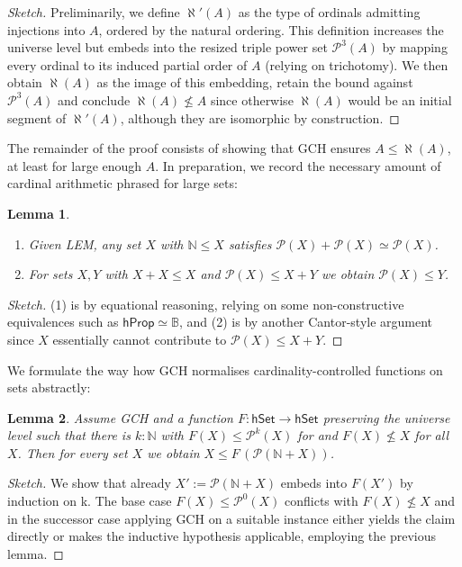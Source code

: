 \documentclass{easychair}
\newcommand{\nat}{\mathbb{N}}
\newcommand{\bool}{\mathbb{B}}
\newcommand{\pow}{\mathcal{P}}
\newcommand{\hprop}{\mathsf{hProp}}
\newcommand{\hset}{\mathsf{hSet}}
\newtheorem{lemma}{Lemma}
\begin{document}
\begin{proof}[Sketch]
	Preliminarily, we define $\aleph'(A)$ as the type of ordinals admitting injections into $A$, ordered by the natural ordering.
	This definition increases the universe level but embeds into the resized triple power set $\pow^3(A)$ by mapping every ordinal to its induced partial order of $A$ (relying on trichotomy).
	We then obtain $\aleph(A)$ as the image of this embedding, retain the bound against $\pow^3(A)$ and conclude $\aleph(A)\not\le A$ since otherwise $\aleph(A)$ would be an initial segment of $\aleph'(A)$, although they are isomorphic by construction.
\end{proof}

The remainder of the proof consists of showing that GCH ensures $A\le\aleph(A)$, at least for large enough $A$.
In preparation, we record the necessary amount of cardinal arithmetic phrased for large sets:

\begin{lemma}
	\label{cardinals}
	\begin{enumerate}[noitemsep]
		\item
		Given LEM, any set $X$ with $\nat\le X$ satisfies $\pow(X)+\pow(X)\simeq \pow(X)$.
		\item
		For sets $X,Y$ with $X+X\le X$ and $\pow (X)\le X+Y$ we obtain $\pow (X)\le Y$.
	\end{enumerate}
\end{lemma}
\begin{proof}[Sketch]
	(1) is by equational reasoning, relying on some non-constructive equivalences such as $\hprop\simeq\bool$, and (2) is by another Cantor-style argument since $X$ essentially cannot contribute to $\pow (X)\le X+Y$.
\end{proof}

We formulate the way how GCH normalises cardinality-controlled functions on sets abstractly:

\begin{lemma}
	\label{sierpinski}
	Assume GCH and a function $F:\hset\to\hset$ preserving the universe level such that there is $k:\nat$ with $F(X)\le \pow^k(X)$ for and $F(X)\not\le X$ for all $X$.
	Then for every set $X$ we obtain $X\le F\,(\pow(\nat + X))$.
\end{lemma}

\begin{proof}[Sketch]
	We show that already $X':=\pow(\nat + X)$ embeds into $F(X')$ by induction on k.
	The base case $F(X)\le \pow^0(X)$ conflicts with $F(X)\not\le X$ and in the successor case applying GCH on a suitable instance either yields the claim directly or makes the inductive hypothesis applicable, employing the previous lemma.
\end{proof}
\end{document}
